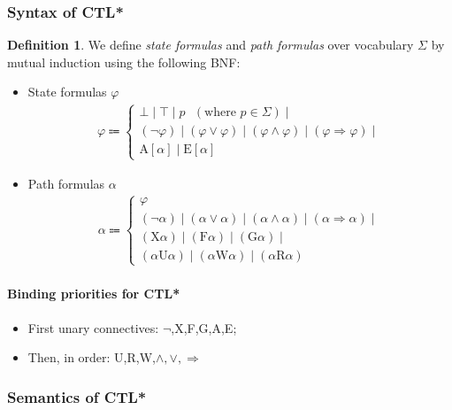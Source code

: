\documentclass[10pt,a4paper]{article}
\theoremstyle{definition}
\newtheorem{definition}{Definition}[section]
\begin{document}
\subsubsection{Syntax of CTL*}
\begin{definition}
We define \textit{state formulas} and \textit{path formulas} over vocabulary $\Sigma$ by mutual induction using the following BNF:
\begin{itemize}
	\item State formulas $\varphi$
\begin{gather*}
\varphi \Coloneqq
\begin{cases}
	\bot \mid \top \mid p \text{ } (\text{where } p \in \Sigma) \mid \\
	(\lnot \varphi) \mid (\varphi \lor \varphi) \mid (\varphi \land \varphi) \mid (\varphi \Rightarrow \varphi) \mid \\
	\text{A}[\alpha] \mid \text{E}[\alpha]
\end{cases}
\end{gather*}
\end{itemize}
\begin{itemize}
	\item Path formulas $\alpha$
\begin{gather*}
\alpha \Coloneqq
\begin{cases}
	\varphi \\
	(\lnot \alpha) \mid (\alpha \lor \alpha) \mid (\alpha \land \alpha) \mid (\alpha \Rightarrow \alpha) \mid \\
	(\text{X}\alpha) \mid (\text{F}\alpha) \mid (\text{G}\alpha) \mid \\
	(\alpha \text{U} \alpha) \mid (\alpha \text{W} \alpha) \mid (\alpha \text{R} \alpha)
\end{cases}
\end{gather*}
\end{itemize}
\end{definition}

\paragraph{Binding priorities for CTL*}
\begin{itemize}
	\item First unary connectives: $\lnot$,X,F,G,A,E;
	\item Then, in order: U,R,W,$\land, \lor, \Rightarrow$
\end{itemize}

\subsubsection{Semantics of CTL*}
\end{document}
